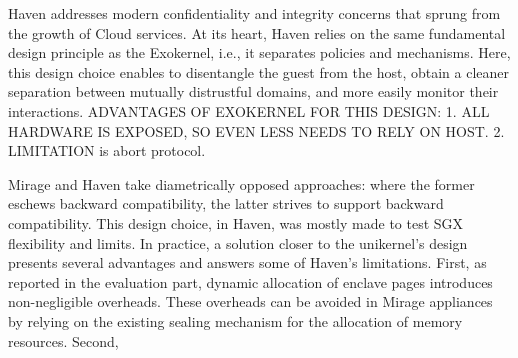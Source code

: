 
Haven addresses modern confidentiality and integrity concerns that sprung from the growth of Cloud services.
At its heart, Haven relies on the same fundamental design principle as the Exokernel, i.e., it separates policies and mechanisms.
Here, this design choice enables to disentangle the guest from the host, obtain a cleaner separation between mutually distrustful domains, and more easily monitor their interactions.
ADVANTAGES OF EXOKERNEL FOR THIS DESIGN:
1. ALL HARDWARE IS EXPOSED, SO EVEN LESS NEEDS TO RELY ON HOST.
2. LIMITATION is abort protocol.


Mirage and Haven take diametrically opposed approaches: where the former eschews backward compatibility, the latter strives to support backward compatibility.
This design choice, in Haven, was mostly made to test SGX flexibility and limits.
In practice, a solution closer to the unikernel's design presents several advantages and answers some of Haven's limitations.
First, as reported in the evaluation part, dynamic allocation of enclave pages introduces non-negligible overheads.
These overheads can be avoided in Mirage appliances by relying on the existing sealing mechanism for the allocation of memory resources.
Second, 


%




